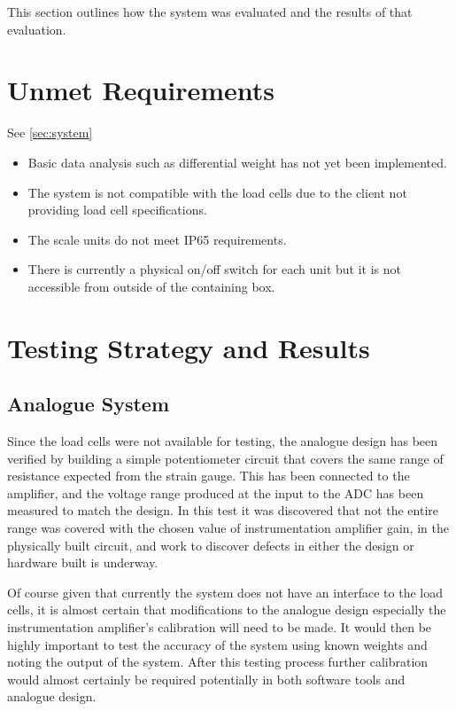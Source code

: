 This section outlines how the system was evaluated and the results of that evaluation.

\section{Unmet Requirements}
See \ref{sec:system}
\begin{itemize}

\item Basic data analysis such as differential weight has not yet been implemented.
\item The system is not compatible with the load cells due to the client not providing load cell specifications.
\item The scale units do not meet IP65 requirements.
\item There is currently a physical on/off switch for each unit but it is not accessible from outside of the containing box.
\end{itemize}
\section{Testing Strategy and Results}

\subsection{Analogue System}
Since the load cells were not available for testing, the analogue design has been verified by building a simple potentiometer circuit that covers the same range of resistance expected from the strain gauge. This has been connected to the amplifier, and the voltage range produced at the input to the ADC has been measured to match the design. In this test it was discovered that not the entire range was covered with the chosen value of instrumentation amplifier gain, in the physically built circuit, and work to discover defects in either the design or hardware built is underway.

Of course given that currently the system does not have an interface to the load cells, it is almost certain that modifications to the analogue design especially the instrumentation amplifier's calibration will need to be made. It would then be highly important to test the accuracy of the system using known weights and noting the output of the system. After this testing process further calibration would almost certainly be required potentially in both software tools and analogue design. 

